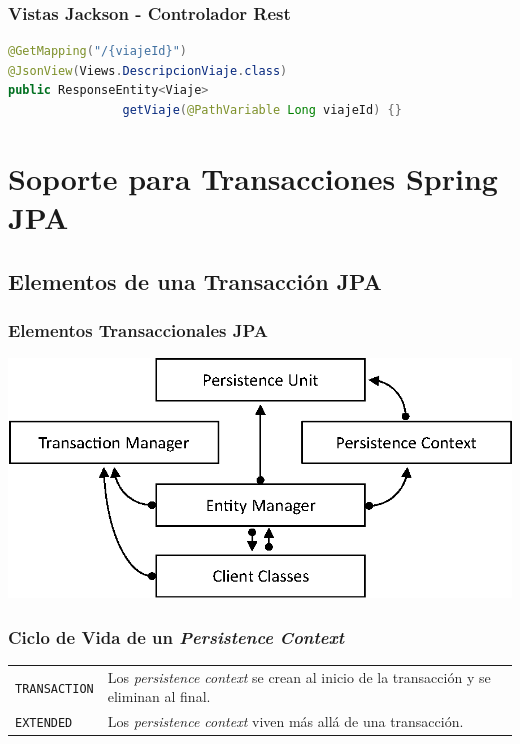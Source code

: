 \documentclass[handout,a4paper,slidestop,xcolor=pst,blue]{beamer}
\begin{document}
\begin{frame}[c,fragile]
    \frametitle{Vistas Jackson - Controlador Rest}
\begin{lstlisting}[basicstyle=\small,language=Java]
@GetMapping("/{viajeId}")
@JsonView(Views.DescripcionViaje.class)
public ResponseEntity<Viaje>
                getViaje(@PathVariable Long viajeId) {}
\end{lstlisting}
\end{frame}

\section{Soporte para Transacciones Spring JPA}

\subsection{Elementos de una Transacción JPA}

\begin{frame}[c]
    \frametitle{Elementos Transaccionales JPA}
    \begin{center}
        \includegraphics[width=0.9\linewidth,keepaspectratio=true]{images/jpa/jpaElements.eps}
    \end{center}
\end{frame}

\begin{frame}[c]
    \frametitle{Ciclo de Vida de un \emph{Persistence Context}}
    \begin{tabular}{lp{}}
        \texttt{TRANSACTION} & Los \emph{persistence context} se crean al inicio de la transacción y se eliminan al final. \\
        \texttt{EXTENDED}    & Los \emph{persistence context} viven más allá de una transacción. \\
    \end{tabular}
\end{frame}
\end{document}
